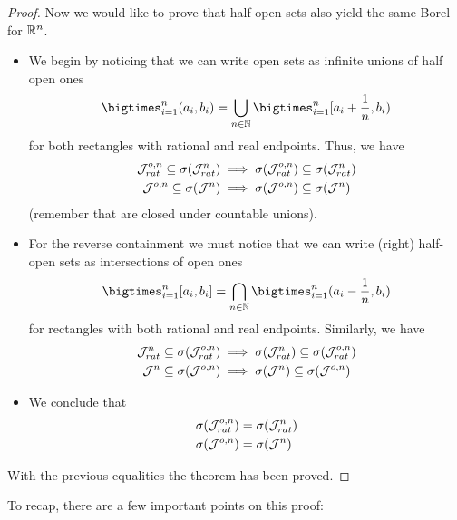\begin{thm}
\begin{proof}
		Now we would like to prove that half open sets also yield the same Borel \siga for $\mathbb{R}^n$.
		\begin{itemize}
			\item We begin by noticing that we can write open sets as infinite unions of half open ones
			\begin{align*}
				\bigtimes_{i = 1}^n (a_i , b_i) = \bigcup_{n \in \N} \bigtimes_{i = 1}^n [a_i + \frac{1}{n}, b_i)
			\end{align*}
			for both rectangles with rational and real endpoints. Thus, we have
			\begin{align*}
				\mathcal{J}_{rat}^{o,n} \subseteq \sigma(\mathcal{J}_{rat}^n) &\implies \sigma(\mathcal{J}_{rat}^{o,n}) \subseteq \sigma(\mathcal{J}_{rat}^n) \\
				\mathcal{J}^{o,n} \subseteq \sigma(\mathcal{J}^n) &\implies \sigma(\mathcal{J}^{o,n}) \subseteq \sigma(\mathcal{J}^n)
			\end{align*}
			(remember that \sigas are closed under countable unions).
			\item For the reverse containment we must notice that we can write (right) half-open sets as intersections of open ones
			\begin{align*}
				\bigtimes_{i = 1}^n [a_i, b_i] = \bigcap_{n \in \N} \bigtimes_{i = 1}^n (a_i - \frac{1}{n}, b_i)
			\end{align*}
			for rectangles with both rational and real endpoints. Similarly, we have
			\begin{align*}
				\mathcal{J}_{rat}^n \subseteq \sigma(\mathcal{J}_{rat}^{o,n}) &\implies \sigma(\mathcal{J}_{rat}^n) \subseteq \sigma(\mathcal{J}_{rat}^{o,n}) \\
				\mathcal{J}^n \subseteq \sigma(\mathcal{J}^{o,n}) &\implies \sigma(\mathcal{J}^n) \subseteq \sigma(\mathcal{J}^{o,n})
			\end{align*}
			\item We conclude that
			\begin{align*}
				\sigma(\mathcal{J}_{rat}^{o,n}) &= \sigma(\mathcal{J}_{rat}^n) \\ \sigma(\mathcal{J}^{o,n}) &= \sigma(\mathcal{J}^n)
			\end{align*}
		\end{itemize}
		With the previous equalities the theorem has been proved.
	\end{proof}
\end{thm}

To recap, there are a few important points on this proof:


